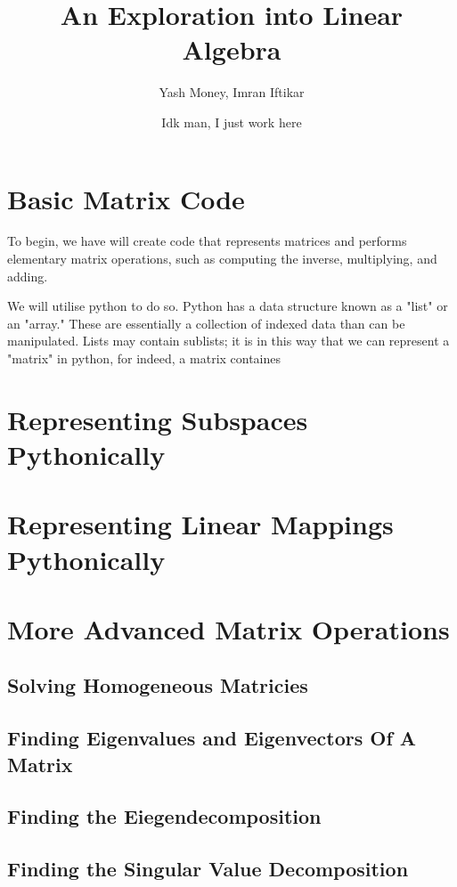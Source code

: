 \documentclass[12pt, a4paper]{article}
\title{An Exploration into Linear Algebra}
\author{Yash Money, Imran Iftikar}
\date{Idk man, I just work here}
\begin{document}
\maketitle



\section{Basic Matrix Code}

To begin, we have will create code that represents matrices and
performs elementary matrix operations, such as computing the inverse, 
multiplying, and adding. 

We will utilise python to do so. Python has a data structure known as a "list" or an "array."
These are essentially a collection of indexed data than can be manipulated. Lists may contain sublists; it is in this way
that we can represent a "matrix" in python, for indeed, a matrix containes



\section{Representing Subspaces Pythonically}

\section{Representing Linear Mappings Pythonically}

\section{More Advanced Matrix Operations}

\subsection{Solving Homogeneous Matricies}

\subsection{Finding Eigenvalues and Eigenvectors Of A Matrix}

\subsection{Finding the Eiegendecomposition}

\subsection{Finding the Singular Value Decomposition}
\end{document}
